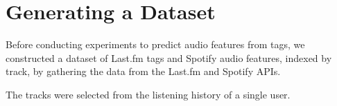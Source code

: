 \documentclass[sn-mathphys]{sn-jnl}%
\theoremstyle{thmstyleone}%
\theoremstyle{thmstyletwo}%
\theoremstyle{thmstylethree}%
\begin{document}






%

\section{Generating a Dataset}\label{sec4}

Before conducting experiments to predict audio features from tags,
we constructed a dataset of Last.fm tags and Spotify audio features, indexed by track, by gathering the data from the Last.fm and Spotify APIs.

The tracks were selected from the listening history of a single user.
\end{document}
